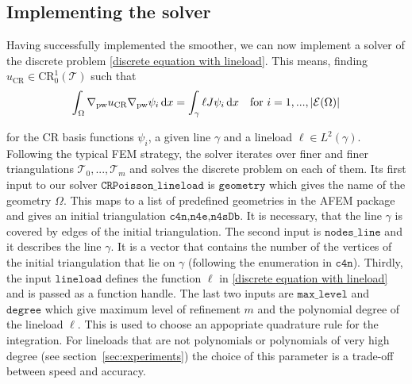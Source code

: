 \documentclass[11pt,a4paper]{article}
\newcommand{\uCR}{u_{\mathrm{CR}}}
\newcommand{\dx}{\,\mathrm{d}x}
\newcommand{\CR}{\mathrm{CR}^1_0(\mathcal{T})}
\begin{document}
\subsection{Implementing the solver}
Having successfully implemented the smoother, we can now implement a solver of the discrete problem \eqref{discrete equation with lineload}. This means, finding \(\uCR \in \CR\) such that
\begin{equation}
\int_\Omega \nabla_\mathrm{pw} \uCR  \nabla_\mathrm{pw} \psi_i \dx = \int_\gamma \ell \space J\psi_i \dx \quad \text{for } i=1,...,|\mathcal{E}(\Omega)|
\end{equation}

for the CR basis functions \(\psi_i\), a given line \(\gamma\) and a lineload \(\ell \in L^2(\gamma)\). Following the typical FEM strategy, the solver iterates over finer and finer triangulations \(\mathcal{T}_0,...,\mathcal{T}_m\) and solves the discrete problem on each of them. Its first input to our solver \(\texttt{CRPoisson\_lineload}\) is \(\texttt{geometry}\) which gives the name of the geometry \(\Omega\). This maps to a list of predefined geometries in the AFEM package and gives an initial triangulation \(\texttt{c4n,n4e,n4sDb}\). It is necessary, that the line \(\gamma\) is covered by edges of the initial triangulation. The second input is \(\texttt{nodes\_line}\) and it describes the line \(\gamma\). It is a vector that contains the number of the vertices of the initial triangulation that lie on \(\gamma\) (following the enumeration in \(\texttt{c4n}\)). Thirdly, the input \(\texttt{lineload}\) defines the function \(\ell\) in \eqref{discrete equation with lineload} and is passed as a function handle. The last two inputs are \(\texttt{max\_level}\) and \(\texttt{degree}\) which give maximum level of refinement \(m\) and the polynomial degree of the lineload \(\ell\). This is used to choose an appopriate quadrature rule for the integration. For lineloads that are not polynomials or polynomials of very high degree (see section~\ref{sec:experiments}) the choice of this parameter is a trade-off between speed and accuracy.
\end{document}
